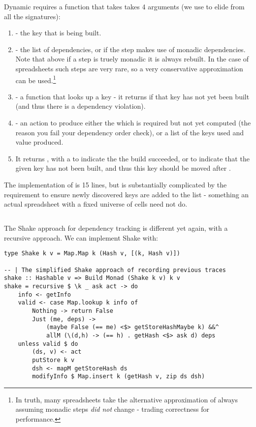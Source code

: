 Dynamic requires a function that takes takes 4 arguments (we use  to elide  from all the signatures):

\begin{enumerate}
\item {} - the key that is being built.
\item {} - the list of dependencies, or  if the step makes use of monadic dependencies. Note that above if a step is truely monadic it is always rebuilt. In the case of spreadsheets such steps are very rare, so a very conservative approximation can be used.\footnote{In truth, many spreadsheets take the alternative approximation of always assuming monadic steps \textit{did not} change - trading correctness for performance.}
\item {} - a function that looks up a key - it returns  if that key has not yet been built (and thus there is a dependency violation).
\item {} - an action to produce either the  which is required but not yet computed (the reason you fail your dependency order check), or a list of the keys used and value produced.
\item It returns , with a  to indicate the the build succeeded, or  to indicate that the given key  has not been built, and thus this key should be moved after .
\end{enumerate}

The implementation of  is 15 lines, but is substantially complicated by the requirement to ensure newly discovered keys are added to the list - something an actual spreadsheet with a fixed universe of cells need not do.

\subsection{\Shake}\label{sec-implementation-shake}

The Shake approach for dependency tracking is different yet again, with a recursive approach. We can implement Shake with:

\begin{verbatim}
type Shake k v = Map.Map k (Hash v, [(k, Hash v)])

-- | The simplified Shake approach of recording previous traces
shake :: Hashable v => Build Monad (Shake k v) k v
shake = recursive $ \k _ ask act -> do
    info <- getInfo
    valid <- case Map.lookup k info of
        Nothing -> return False
        Just (me, deps) ->
            (maybe False (== me) <$> getStoreHashMaybe k) &&^
            allM (\(d,h) -> (== h) . getHash <$> ask d) deps
    unless valid $ do
        (ds, v) <- act
        putStore k v
        dsh <- mapM getStoreHash ds
        modifyInfo $ Map.insert k (getHash v, zip ds dsh)
\end{verbatim}

